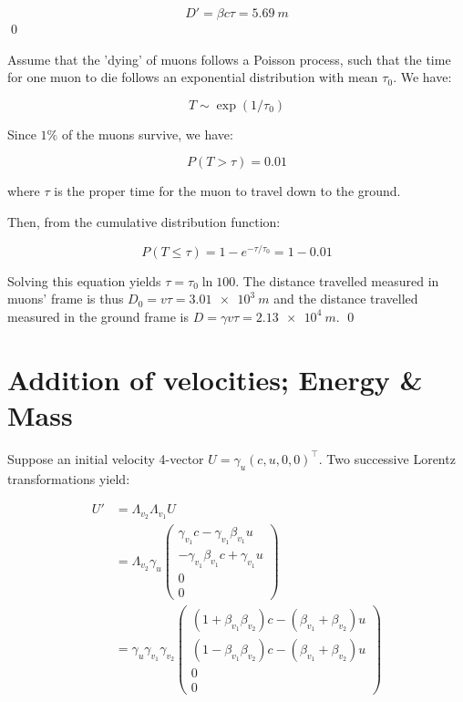 \documentclass[12pt]{article}
\begin{document}

\begin{equation}
    D' = \beta c \tau = \qty{5.69}{m}
\end{equation}
\qed


Assume that the 'dying' of muons follows a Poisson process, such that the time for one muon to die follows an exponential distribution with mean $\tau_{0}$. We have:

\begin{equation}
    T \sim \exp(1/\tau_{0})
\end{equation}

Since $1\%$ of the muons survive, we have:

\begin{equation}
    P(T > \tau) = 0.01
\end{equation}

where $\tau$ is the proper time for the muon to travel down to the ground.

Then, from the cumulative distribution function:

\begin{equation}
    P(T \le \tau) = 1 - e^{-\tau/\tau_{0}} = 1 - 0.01
\end{equation}

Solving this equation yields $\tau = \tau_{0} \ln{100}$. The distance travelled measured in muons' frame is thus $D_{0} = v \tau = \qty{3.01e3}{m}$ and the distance travelled measured in the ground frame is $D = \gamma v \tau = \qty{2.13e4}{m}$.
\qed


\pagebreak
\section*{Addition of velocities; Energy \& Mass}


Suppose an initial velocity 4-vector $U = \gamma_{u} (c, u, 0, 0)^{\intercal}$. Two successive Lorentz transformations yield:

\begin{equation}
    \begin{split}
        U' &= \Lambda_{v_{2}} \Lambda_{v_{1}} U \\
        &= \Lambda_{v_{2}} \gamma_{u} \begin{pmatrix} \gamma_{v_{1}}c - \gamma_{v_{1}} \beta_{v_{1}} u \\ -\gamma_{v_{1}} \beta_{v_{1}} c + \gamma_{v_{1}} u \\ 0 \\ 0 \end{pmatrix} \\
        &= \gamma_{u} \gamma_{v_{1}} \gamma_{v_{2}} \begin{pmatrix} (1 + \beta_{v_{1}} \beta_{v_{2}})c - (\beta_{v_{1}} + \beta_{v_{2}}) u \\ (1 - \beta_{v_{1}} \beta_{v_{2}})c - (\beta_{v_{1}} + \beta_{v_{2}}) u \\ 0 \\ 0 \end{pmatrix}
    \end{split}
\end{equation}
\end{document}
